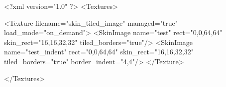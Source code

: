 <?xml version="1.0" ?>
<Textures>

	<Texture filename="skin_tiled_image" managed="true" load_mode="on_demand">
		<SkinImage name="test" rect="0,0,64,64" skin_rect="16,16,32,32" tiled_borders="true"/>
		<SkinImage name="test_indent" rect="0,0,64,64" skin_rect="16,16,32,32" tiled_borders="true" border_indent="4,4"/>
	</Texture>
	
</Textures>
